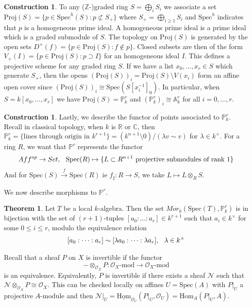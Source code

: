 \documentclass[letterpaper,10pt,twoside]{amsart}
\theoremstyle{proposition}
\theoremstyle{definition}
\theoremstyle{theorem}
\newtheorem{theorem}[proposition]{Theorem}
\theoremstyle{definition}
\theoremstyle{definition}
\theoremstyle{definition}
\theoremstyle{lemma}
\theoremstyle{definition}
\theoremstyle{definition}
\newtheorem{construct}[proposition]{Construction}
\theoremstyle{corollary}
\theoremstyle{definition}
\def\Hom{\text{Hom}}
\def\Spec{\text{Spec}}
\def\O{\mathcal{O}}
\def\Proj{\text{Proj}}
\def\P{\mathbb{P}}
\def\A{\mathbb{A}}
\begin{document}
\begin{construct}
    To any ($\mathbb{Z}$-)graded ring $S = \bigoplus_i S_i$ we associate a set $\Proj(S) = \{p \in \Spec^h(S) : p\not\subset S_+\}$ where $S_+=\bigoplus_{i\geq 1}S_i$ and $\Spec^h$ indicates that $p$ is a homogeneous prime ideal. A homogeneous prime ideal is a prime ideal which is a graded submodule of $S$. The topology on $\Proj(S)$ is generated by the open sets $D^+(f)=\{p\in \Proj(S):f\notin p\}$. Closed subsets are then of the form $V_+(I) = \{p\in\Proj(S): p\supset I\}$ for an homogeneous ideal $I$. This defines a projective scheme for any graded ring $S$. If we have a list $x_0,\dots,x_r \in S$ which generate $S_+$, then the opens $(\Proj(S))_i=\Proj(S)\setminus V(x_i)$ form an affine open cover since $(\Proj(S))_i \cong \Spec(S[x_i^{-1}]_0)$. In particular, when $S=k[x_0,\dots,x_r]$ we have $\Proj(S)=\P^r_k$ and $(\P^r_k)_i\cong \A^r_k$ for all $i=0,\dots,r$.
\end{construct}
\begin{construct}
    Lastly, we describe the functor of points associated to $\P^r_k$. Recall in classical topology, when $k$ is $\mathbb{R}$ or $\mathbb{C}$, then $\P^r_k=\{\text{lines through origin in }k^{r+1}\} = (k^{n+1}\setminus 0)/(\lambda v\sim v)$ for $\lambda \in k^\times$. For a ring $R$, we want that $\P^r$ represents the functor \[Aff^{op}\to Set, \hspace{0.1in} \Spec(R)\mapsto\{L \subset R^{n+1} \text{ projective submodules of rank }1\}\] And for $\Spec(S)\xrightarrow{f}\Spec(R)$ ie $f_\sharp:R\to S$, we take $L\mapsto L\otimes_R S$.
\end{construct}
We now describe morphisms to $\P^r$.

\begin{theorem}
    Let $T$ be a local $k$-algebra. Then the set $Mor_k(\Spec(T),\P^r_k)$ is in bijection with the set of $(r+1)$-tuples $[a_0:\dots:a_r] \in k^{r+1}$ such that $a_i\in k^\times$ for some $0\leq i\leq r$, modulo the equivalence relation \[[a_0:\dots:a_r]\sim[\lambda a_0:\dots:\lambda a_r], \hspace{0.1in} \lambda \in k^\times\]
\end{theorem}

Recall that a sheaf $P$ on $X$ is invertible if the functor \[-\otimes_{\O_X} P: \O_X\text{-mod}\to \O_X\text{-mod}\] is an equivalence. Equivalently, $P$ is invertible if there exists a sheaf $\mathcal{N}$ such that $\mathcal{N}\otimes_{\O_X}P \cong \O_X$. This can be checked locally on affines $U=\Spec(A)$ with $P|_U$ a projective $A$-module and then $\mathcal{N}|_U=\underline{\Hom}_{\O_U}(P|_U,\O_U) = \Hom_A(P|_U,A)$. \cite{Stacks1}
\end{document}
